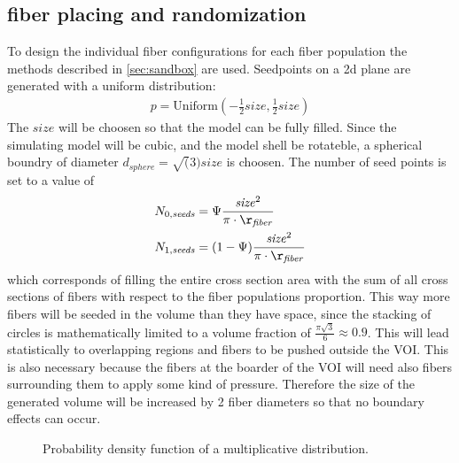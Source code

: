 \subsection{fiber placing and randomization}
% 
To design the individual fiber configurations for each fiber population the methods described in \cref{sec:sandbox} are used.
Seedpoints on a 2d plane are generated with a uniform distribution:
\begin{align}
p = \mathrm{Uniform}(-\frac{1}{2}\mathit{size},\frac{1}{2}\mathit{size})
\end{align}
The $\mathit{size}$ will be choosen so that the model can be fully filled.
Since the simulating model will be cubic, and the model shell be rotateble, a spherical boundry of diameter $d_{\mathit{sphere}}=\sqrt(3) \mathit{size}$ is choosen.
The number of seed points is set to a value of 
\begin{align}
N_{0,\mathit{seeds}} &= \Psi \frac{\mathit{size}^2}{\pi \cdot \r_{\mathit{fiber}}}\\
N_{1,\mathit{seeds}} &= (1-\Psi) \frac{\mathit{size}^2}{\pi \cdot \r_{\mathit{fiber}}}
\end{align}
which corresponds of filling the entire cross section area with the sum of all cross sections of fibers with respect to the fiber populations proportion.
This way more fibers will be seeded in the volume than they have space, since the stacking of circles is mathematically limited to a volume fraction of $\frac{\pi \sqrt{3}}{6} \approx 0.9$.
This will lead statistically to overlapping regions and fibers to be pushed outside the \ac{VOI}.
This is also necessary because the fibers at the boarder of the \ac{VOI} will need also fibers surrounding them to apply some kind of pressure.
Therefore the size of the generated volume will be increased by 2 fiber diameters so that no boundary effects can occur.
\par
% 
\begin{figure}[!t]
\centering
\tikzset{external/export=false}
\caption[]{ Probability density function of a multiplicative  distribution.}
\label{fig:logNormal}
\end{figure}
